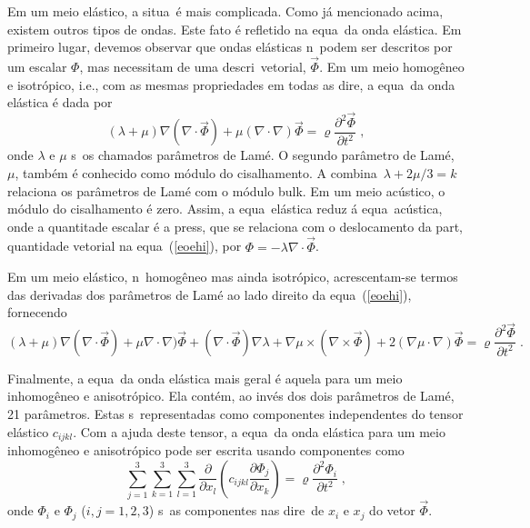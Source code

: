 Em um meio el\'astico, a situa\cao\ \'e mais complicada. Como j\'a
mencionado acima, existem outros tipos de ondas. Este fato \'e refletido
na equa\cao\ da onda el\'astica. Em primeiro lugar, devemos observar que
ondas el\'asticas n\ao\ podem ser descritos por um escalar $\Phi$, mas
necessitam de uma descri\cao\ vetorial, $\vec\Phi$. Em um meio
homog\^eneo e isotr\'opico, i.e., com as mesmas propriedades em todas as
dire\coes, a equa\cao\ da onda el\'astica \'e dada por
\begin{equation}
(\lambda+\mu) \nabla ( \nabla \cdot \vec\Phi) + \mu (\nabla \cdot \nabla)
\vec\Phi = \varrho
\frac{\partial^2 \vec\Phi}{\partial t^2} \; ,
\label{eoehi}
\end{equation}
onde $\lambda$ e $\mu$ s\ao\ os chamados par\^ametros de Lam\'e. O
segundo par\^ametro de Lam\'e, $\mu$, tamb\'em \'e conhecido como
m\'odulo do cisalhamento. A combina\cao\ $\lambda+2\mu/3 = k$ relaciona
os par\^ametros de Lam\'e com o m\'odulo bulk. Em um meio ac\'ustico, o
m\'odulo do cisalhamento \'e zero. Assim, a equa\cao\ el\'astica reduz
\'a equa\cao\ ac\'ustica, onde a quantitade escalar \'e a press\ao, que
se relaciona com o deslocamento da part\icula, quantidade vetorial na
equa\cao\ (\ref{eoehi}), por $\Phi=-\lambda\nabla\cdot\vec\Phi$.

Em um meio el\'astico, n\ao\ homog\^eneo mas ainda isotr\'opico,
acrescentam-se termos das derivadas dos par\^ametros de Lam\'e ao
lado direito da equa\cao\ (\ref{eoehi}), fornecendo
\begin{equation}
(\lambda+\mu) \nabla ( \nabla \cdot \vec\Phi) + \mu \nabla \cdot \nabla)
\vec\Phi
+(\nabla \cdot \vec\Phi) \nabla \lambda 
+\nabla\mu \times (\nabla \times \vec\Phi) 
+2(\nabla\mu \cdot \nabla) \vec\Phi 
= \varrho
\frac{\partial^2 \vec\Phi}{\partial t^2} \; .
\label{eoeii}
\end{equation}

Finalmente, a equa\cao\ da onda el\'astica mais geral \'e aquela para um
meio inhomog\^eneo e anisotr\'opico. Ela cont\'em, ao inv\'es dos dois
par\^ametros de Lam\'e, 21 par\^ametros. Estas s\ao\ representadas como
componentes independentes do tensor el\'astico $c_{ijkl}$. Com a ajuda
deste tensor, a equa\cao\ da onda el\'astica para um meio inhomog\^eneo
e anisotr\'opico pode ser escrita usando componentes como
\begin{equation}
\sum\limits_{j=1}^3
\sum\limits_{k=1}^3
\sum\limits_{l=1}^3
\frac{\partial}{\partial x_l}
\left(c_{ijkl} \frac{\partial \Phi_j}{\partial x_k}\right)
= \varrho
\frac{\partial^2 \Phi_i}{\partial t^2} \; ,
\label{eoeia}
\end{equation}
onde $\Phi_i$ e $\Phi_j$ ($i,j=1,2,3$) s\ao\ as componentes nas
dire\coes\ de $x_i$ e $x_j$ do vetor $\vec\Phi$.

